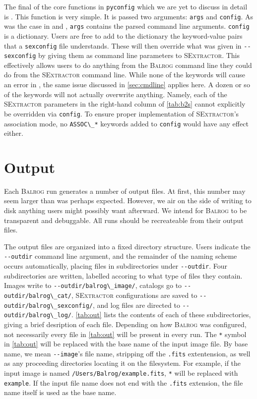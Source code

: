 \documentclass[12pt]{book}
\newcommand{\codett}[1]{\lstinline{#1}}
\newcommand{\pyconfig}{\codett{pyconfig}}
\newcommand{\balrog}{\textsc{Balrog}}
\newcommand{\sex}{\textsc{SExtractor}}
\newcommand{\opt}[1]{\codett{--#1}}
\begin{document}
The final of the core functions in \pyconfig{} which we are yet to discuss in detail is \sexfunc{}.
This function is very simple. It is passed two arguments: \codett{args} and \codett{config}.
As was the case in \simfunc{} and \gspfunc{}, \codett{args} contains the parsed command line arguments.
\codett{config} is a dictionary. Users are free to add to the dictionary the keyword-value pairs
that a \codett{sexconfig} file understands. These will then override what was given in \opt{sexconfig}
by giving them as command line parameters to \sex{}.
This effectively allows users to do anything from the \balrog{} command line they could do from the \sex{} command line.
While none of the keywords will cause an error in \sexfunc{}, 
the same issue discussed in \autoref{sec:cmdline} applies here.
A dozen or so of the keywords will not actually overwrite anything.
Namely, each of the \sex{} parameters in the right-hand column of \autoref{tab:b2s} cannot explicitly be overridden via \codett{config}.
To ensure proper implementation of \sex{}'s association mode, no \codett{ASSOC\_*} keywords added to \codett{config}
would have any effect either.


\chapter{Output}
\label{sec:out}
Each \balrog{} run generates a number of output files. 
At first, this number may seem larger than was perhaps expected.
However, we air on the side of writing to disk anything users might possibly want afterward.
We intend for \balrog{} to be transparent and debuggable.
All runs should be recreateable from their output files.

The output files are organized into a fixed directory structure.
Users indicate the \opt{outdir} command line argument, and
the remainder of the naming scheme occurs automatically,
placing files in subdirectories under \opt{outdir}.
Four subdirectories are written, labelled accoring to what
type of files they contain. 
Images write to \opt{outdir}\codett{/balrog\_image/}, 
catalogs go to \opt{outdir}\codett{/balrog\_cat/},
\sex{} configurations are saved to \opt{outdir}\codett{/balrog\_sexconfig/},
and log files are directed to \opt{outdir}\codett{/balrog\_log/}.
\autoref{tab:out} lists the contents of each of these subdirectories,
giving a brief desription of each file. Depending on how
\balrog{} was configured, not necessarily every file
in \autoref{tab:out} will be present in every run.
The \codett{*} symbol in \autoref{tab:out} will be replaced with
the base name of the input image file.
By base name, we mean \opt{image}'s file name, stripping off the \codett{.fits} extentension,
as well as any proceeding directories locating it on the filesystem.
For example,
if the input image is named \codett{/Users/Balrog/example.fits},
\codett{*} will be replaced with \codett{example}.
If the input file name does not end with the \codett{.fits}
extension, the file name itself is used as the base name.
\end{document}
